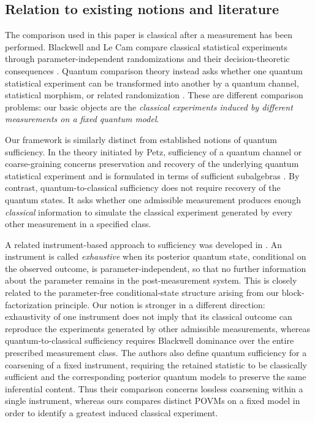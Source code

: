 \documentclass{article}
\theoremstyle{named}
\theoremstyle{named1}
\theoremstyle{plain}
\theoremstyle{remark}
\begin{document}
\subsection{Relation to existing notions and literature}
\label{subsec:related-literature}

The comparison used in this paper is classical after a measurement has been
performed. Blackwell and Le Cam compare classical statistical experiments
through parameter-independent randomizations and their decision-theoretic
consequences
\cite{Blackwell1951,Blackwell1953,LeCam1964,LeCam1996,LeCam1986,Torgersen1991}.
Quantum comparison theory instead asks whether one quantum statistical
experiment can be transformed into another by a quantum channel, statistical
morphism, or related randomization
\cite{Buscemi2012,Matsumoto2012,Jencova2016}. These are different comparison
problems: our basic objects are the \emph{classical experiments induced by
different measurements on a fixed quantum model}.

Our framework is similarly distinct from established notions of quantum
sufficiency. In the theory initiated by Petz, sufficiency of a quantum
channel or coarse-graining concerns preservation and recovery of the
underlying quantum statistical experiment and is formulated in terms of
sufficient subalgebras
\cite{Petz1986,JencovaPetz2006,JencovaPetzSurvey2006}.
By contrast, quantum-to-classical
sufficiency does not require recovery of the quantum states. It asks whether
one admissible measurement produces enough \emph{classical} information to
simulate the classical experiment generated by every other measurement in a
specified class.

A related instrument-based approach to sufficiency was developed in
\cite[Section~5]{MR2017871}. An instrument is called
\emph{exhaustive} when its posterior quantum state, conditional on the
observed outcome, is parameter-independent, so that no further information
about the parameter remains in the post-measurement system. This is closely
related to the parameter-free conditional-state structure arising from our
block-factorization principle. Our notion is stronger in a different
direction: exhaustivity of one instrument does not imply that its classical
outcome can reproduce the experiments generated by other admissible
measurements, whereas quantum-to-classical sufficiency requires Blackwell
dominance over the entire prescribed measurement class. The authors also
define quantum sufficiency for a coarsening of a fixed instrument, requiring
the retained statistic to be classically sufficient and the corresponding
posterior quantum models to preserve the same inferential content. Thus their
comparison concerns lossless coarsening within a single instrument, whereas
ours compares distinct POVMs on a fixed model in order to identify a greatest
induced classical experiment.
\end{document}
